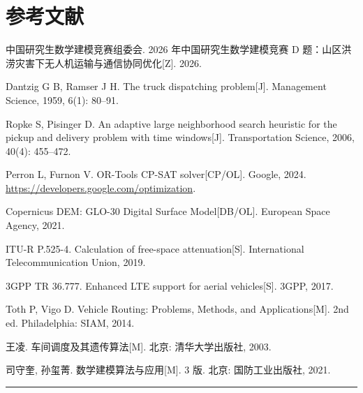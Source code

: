 \documentclass[12pt,a4paper,fontset=windows]{ctexart}
\begin{document}
\section*{参考文献}
\begin{sloppypar}
\begin{enumerate}[label={[\arabic*]},leftmargin=2.6em,itemsep=2pt]
\item 中国研究生数学建模竞赛组委会. 2026 年中国研究生数学建模竞赛 D 题：山区洪涝灾害下无人机运输与通信协同优化[Z]. 2026.
\item Dantzig G B, Ramser J H. The truck dispatching problem[J]. Management Science, 1959, 6(1): 80--91.
\item Ropke S, Pisinger D. An adaptive large neighborhood search heuristic for the pickup and delivery problem with time windows[J]. Transportation Science, 2006, 40(4): 455--472.
\item Perron L, Furnon V. OR-Tools CP-SAT solver[CP/OL]. Google, 2024. \url{https://developers.google.com/optimization}.
\item Copernicus DEM: GLO-30 Digital Surface Model[DB/OL]. European Space Agency, 2021.
\item ITU-R P.525-4. Calculation of free-space attenuation[S]. International Telecommunication Union, 2019.
\item 3GPP TR 36.777. Enhanced LTE support for aerial vehicles[S]. 3GPP, 2017.
\item Toth P, Vigo D. Vehicle Routing: Problems, Methods, and Applications[M]. 2nd ed. Philadelphia: SIAM, 2014.
\item 王凌. 车间调度及其遗传算法[M]. 北京: 清华大学出版社, 2003.
\item 司守奎, 孙玺菁. 数学建模算法与应用[M]. 3 版. 北京: 国防工业出版社, 2021.
\end{enumerate}
\end{sloppypar}

\vspace{1em}
\noindent\rule{\linewidth}{0.4pt}
\end{document}

